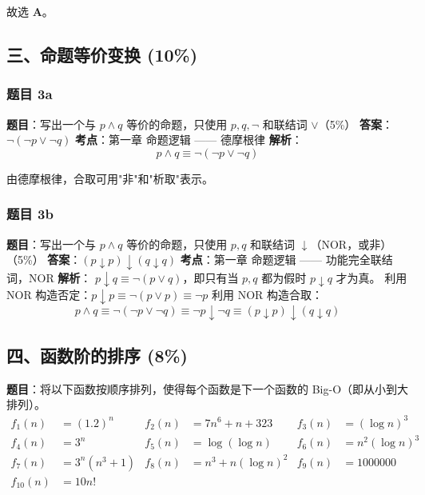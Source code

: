 \documentclass[10pt,a4paper,openany]{ctexbook}
\theoremstyle{definition}
\theoremstyle{remark}
\begin{document}
故选 \textbf{A}。
\vspace{-2pt}

\subsection{三、命题等价变换 (10\%)}

\subsubsection{题目 3a}

\textbf{题目}：写出一个与 $p \land q$ 等价的命题，只使用 $p, q, \neg$ 和联结词 $\lor$（5\%）
\textbf{答案}：$\neg(\neg p \lor \neg q)$
\textbf{考点}：第一章 命题逻辑 —— 德摩根律
\textbf{解析}：
\[
p \land q \equiv \neg(\neg p \lor \neg q)
\]

由德摩根律，合取可用"非"和"析取"表示。
\vspace{-2pt}

\subsubsection{题目 3b}

\textbf{题目}：写出一个与 $p \land q$ 等价的命题，只使用 $p, q$ 和联结词 $\downarrow$（NOR，或非）（5\%）
\textbf{答案}：$(p \downarrow p) \downarrow (q \downarrow q)$
\textbf{考点}：第一章 命题逻辑 —— 功能完全联结词，NOR
\textbf{解析}：
$p \downarrow q \equiv \neg(p \lor q)$，即只有当 $p, q$ 都为假时 $p \downarrow q$ 才为真。
利用 NOR 构造否定：$p \downarrow p \equiv \neg(p \lor p) \equiv \neg p$
利用 NOR 构造合取：
\[
p \land q \equiv \neg(\neg p \lor \neg q) \equiv \neg p \downarrow \neg q \equiv (p \downarrow p) \downarrow (q \downarrow q)
\]

\vspace{-2pt}

\subsection{四、函数阶的排序 (8\%)}

\textbf{题目}：将以下函数按顺序排列，使得每个函数是下一个函数的 Big-O（即从小到大排列）。
\[
\begin{aligned}
f_1(n) &= (1.2)^n & f_2(n) &= 7n^6 + n + 323 & f_3(n) &= (\log n)^3 \\
f_4(n) &= 3^n & f_5(n) &= \log(\log n) & f_6(n) &= n^2(\log n)^3 \\
f_7(n) &= 3^n(n^3 + 1) & f_8(n) &= n^3 + n(\log n)^2 & f_9(n) &= 1000000 \\
f_{10}(n) &= 10n!
\end{aligned}
\]
\end{document}
